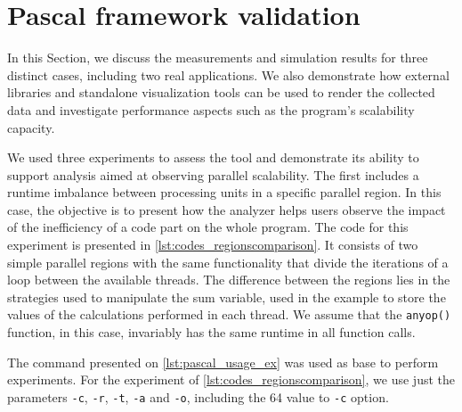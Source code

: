 %

\section{Pascal framework validation} \label{sec:pascal_framework_validation}
In this Section, we discuss the measurements and simulation results for three distinct cases, including two real applications. We also demonstrate how external libraries and standalone visualization tools can be used to render the collected data and investigate performance aspects such as the program's scalability capacity.

We used three experiments to assess the tool and demonstrate its ability to support analysis aimed at observing parallel scalability. The first includes a runtime imbalance between processing units in a specific parallel region. In this case, the objective is to present how the analyzer helps users observe the impact of the inefficiency of a code part on the whole program. The code for this experiment is presented in \cref{lst:codes_regionscomparison}. It consists of two simple parallel regions with the same functionality that divide the iterations of a loop between the available threads. The difference between the regions lies in the strategies used to manipulate the sum variable, used in the example to store the values of the calculations performed in each thread. We assume that the {\tt anyop()} function, in this case, invariably has the same runtime in all function calls.

The command presented on \cref{lst:pascal_usage_ex} was used as base to perform experiments. For the experiment of \cref{lst:codes_regionscomparison}, we use just the parameters {\tt -c}, {\tt -r}, {\tt -t}, {\tt -a} and {\tt -o}, including the 64 value to {\tt -c} option.


